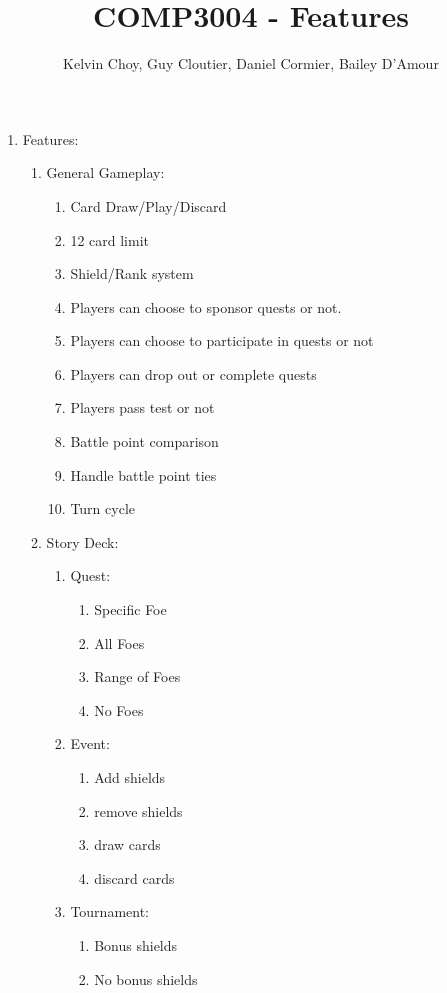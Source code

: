 \documentclass[11pt]{article}
\title{COMP3004 - Features}
\author{Kelvin Choy, Guy Cloutier, Daniel Cormier, Bailey D'Amour}
\date{}
\begin{document}
\maketitle

\begin{enumerate}
\item Features:
	\begin{enumerate}
	\item General Gameplay:
		\begin{enumerate}
		\item Card Draw/Play/Discard
		\item 12 card limit
		\item Shield/Rank system
		\item Players can choose to sponsor quests or not.
		\item Players can choose to participate in quests or not
		\item Players can drop out or complete quests
		\item Players pass test or not
		\item Battle point comparison
		\item Handle battle point ties
		\item Turn cycle
		\end{enumerate}
	\item Story Deck:
		\begin{enumerate}
		\item Quest:
			\begin{enumerate}
			\item Specific Foe
			\item All Foes
			\item Range of Foes
			\item No Foes
			\end{enumerate}
		\item Event:
			\begin{enumerate}
			\item Add shields
			\item remove shields
			\item draw cards
			\item discard cards
			\end{enumerate}
		\item Tournament:
			\begin{enumerate}
			\item Bonus shields
			\item No bonus shields
			\end{enumerate}
		\end{enumerate}

\end{enumerate}
\end{enumerate}
\end{document}
